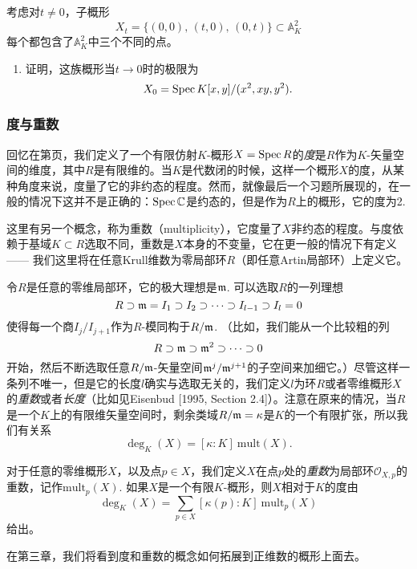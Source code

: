 \begin{exe}
	考虑对$t\neq 0$，子概形
	\[
	X_t=\{(0,0)\text{, }(t,0)\text{, }(0,t)\}\subset \mathbb{A}_K^2
	\]
	每个都包含了$\mathbb{A}_{K}^2$中三个不同的点。

	\begin{enumerate}[{(a)}]\setlength{\itemsep}{0pt}
		\item 证明，这族概形当$t\to 0$时的极限为
		\[
		X_0=\operatorname{Spec} K[x,y]/(x^2,xy,y^2).
		\]
	\end{enumerate}
\end{exe}

\subsubsection*{度与重数}

回忆在第\pageref{deg}页，我们定义了一个有限仿射$K$-概形$X=\operatorname{Spec} R$的\textit{度}是$R$作为$K$-矢量空间的维度，其中$R$是有限维的。当$K$是代数闭的时候，这样一个概形$X$的度，从某种角度来说，度量了它的非约态的程度。然而，就像最后一个习题所展现的，在一般的情况下这并不是正确的：$\operatorname{Spec} \mathbb{C}$是约态的，但是作为$R$上的概形，它的度为2.

这里有另一个概念，称为重数（multiplicity），它度量了$X$非约态的程度。与度依赖于基域$K\subset R$选取不同，重数是$X$本身的不变量，它在更一般的情况下有定义 ------ 我们这里将在任意Krull维数为零局部环$R$（即任意Artin局部环）上定义它。

令$R$是任意的零维局部环，它的极大理想是$\mathfrak{m}$. 可以选取$R$的一列理想
\[
	R\supset \mathfrak{m} = I_1\supset I_2\supset \cdots \supset I_{l-1}\supset I_l=0
\]
使得每一个商$I_j/I_{j+1}$作为$R$-模同构于$R/\mathfrak{m}$. （比如，我们能从一个比较粗的列
\[
	R\supset \mathfrak{m} \supset \mathfrak{m}^2\supset \cdots \supset 0
\]
开始，然后不断选取任意$R/\mathfrak{m}$-矢量空间$\mathfrak{m}^j/\mathfrak{m}^{j+1}$的子空间来加细它。）尽管这样一条列不唯一，但是它的长度$l$确实与选取无关的，我们定义$l$为环$R$或者零维概形$X$的\textit{重数}或者\textit{长度}（比如见Eisenbud [1995, Section 2.4]）。注意在原来的情况，当$R$是一个$K$上的有限维矢量空间时，剩余类域$R/\mathfrak{m}=\kappa$是$K$的一个有限扩张，所以我们有关系
\[
	\deg_K(X)=[\kappa:K]~\mathrm{mult}(X).
\]

对于任意的零维概形$X$，以及点$p\in X$，我们定义$X$在点$p$处的\textit{重数}为局部环$\mathscr{O}_{X,p}$的重数，记作$\mathrm{mult}_p(X)$. 如果$X$是一个有限$K$-概形，则$X$相对于$K$的度由
\[
	\deg_K(X)=\sum_{p\in X}[\kappa(p):K]~\mathrm{mult}_p(X)
\]
给出。

在第三章，我们将看到度和重数的概念如何拓展到正维数的概形上面去。

